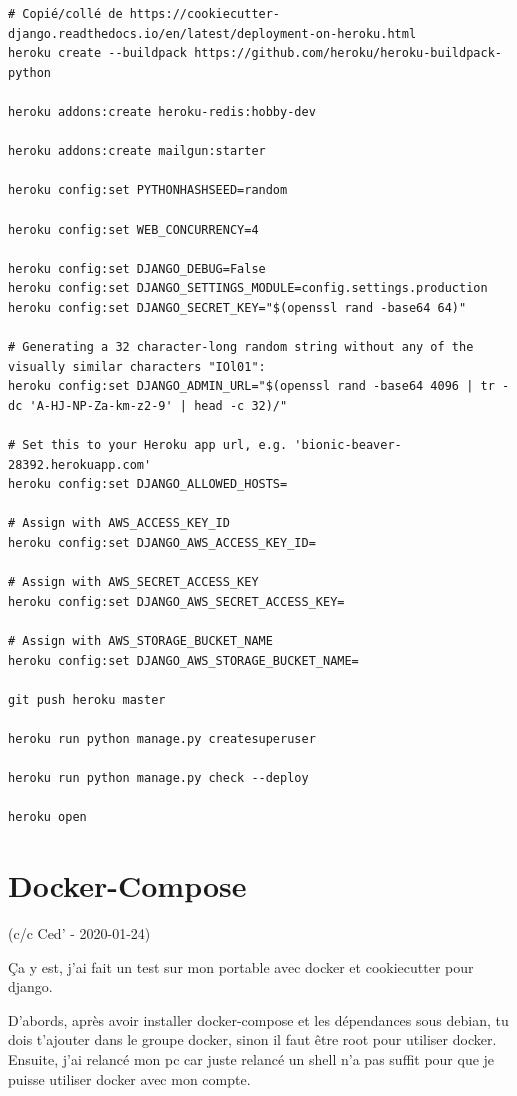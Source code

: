 \documentclass[11pt]{amsbook}
\begin{document}
\begin{verbatim}
# Copié/collé de https://cookiecutter-django.readthedocs.io/en/latest/deployment-on-heroku.html
heroku create --buildpack https://github.com/heroku/heroku-buildpack-python

heroku addons:create heroku-redis:hobby-dev

heroku addons:create mailgun:starter

heroku config:set PYTHONHASHSEED=random

heroku config:set WEB_CONCURRENCY=4

heroku config:set DJANGO_DEBUG=False
heroku config:set DJANGO_SETTINGS_MODULE=config.settings.production
heroku config:set DJANGO_SECRET_KEY="$(openssl rand -base64 64)"

# Generating a 32 character-long random string without any of the visually similar characters "IOl01":
heroku config:set DJANGO_ADMIN_URL="$(openssl rand -base64 4096 | tr -dc 'A-HJ-NP-Za-km-z2-9' | head -c 32)/"

# Set this to your Heroku app url, e.g. 'bionic-beaver-28392.herokuapp.com'
heroku config:set DJANGO_ALLOWED_HOSTS=

# Assign with AWS_ACCESS_KEY_ID
heroku config:set DJANGO_AWS_ACCESS_KEY_ID=

# Assign with AWS_SECRET_ACCESS_KEY
heroku config:set DJANGO_AWS_SECRET_ACCESS_KEY=

# Assign with AWS_STORAGE_BUCKET_NAME
heroku config:set DJANGO_AWS_STORAGE_BUCKET_NAME=

git push heroku master

heroku run python manage.py createsuperuser

heroku run python manage.py check --deploy

heroku open
\end{verbatim}

\hypertarget{x-docker-compose}{\section{Docker-Compose}}
(c/c Ced' - 2020-01-24)


Ça y est, j’ai fait un test sur mon portable avec docker et cookiecutter pour django.


D’abords, après avoir installer docker-compose et les dépendances sous debian, tu dois t’ajouter dans le groupe docker, sinon il faut être root pour utiliser docker.
Ensuite, j’ai relancé mon pc car juste relancé un shell n’a pas suffit pour que je puisse utiliser docker avec mon compte.
\end{document}
